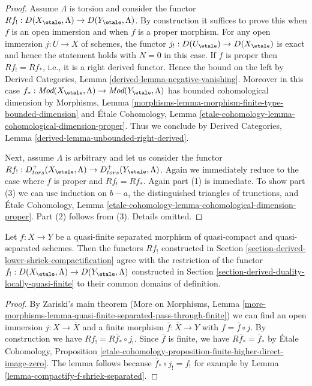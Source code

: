 \begin{proof}
Assume $\Lambda$ is torsion and consider the functor
$Rf_! : D(X_\etale, \Lambda) \to D(Y_\etale, \Lambda)$.
By construction it suffices to prove this when $f$ is an open immersion
and when $f$ is a proper morphism. For any open immersion $j : U \to X$
of schemes, the functor $j_! : D(U_\etale) \to D(X_\etale)$ is exact
and hence the statement holds with $N = 0$ in this case.
If $f$ is proper then $Rf_! = Rf_*$, i.e., it is a right derived
functor. Hence the bound on the left by
Derived Categories, Lemma \ref{derived-lemma-negative-vanishing}.
Moreover in this case $f_* : \textit{Mod}(X_\etale, \Lambda)
\to \textit{Mod}(Y_\etale, \Lambda)$ has bounded cohomological dimension by
Morphisms, Lemma \ref{morphisms-lemma-morphism-finite-type-bounded-dimension}
and \'Etale Cohomology, Lemma
\ref{etale-cohomology-lemma-cohomological-dimension-proper}.
Thus we conclude by
Derived Categories, Lemma \ref{derived-lemma-unbounded-right-derived}.

\medskip\noindent
Next, assume $\Lambda$ is arbitrary and let us consider the functor
$Rf_! : D^+_{tors}(X_\etale, \Lambda) \to D^+_{tors}(Y_\etale, \Lambda)$.
Again we immediately reduce to the case where $f$ is proper and
$Rf_! = Rf_*$. Again part (1) is immediate. To show part (3)
we can use induction on $b - a$, the distinguished
triangles of trunctions, and \'Etale Cohomology, Lemma
\ref{etale-cohomology-lemma-cohomological-dimension-proper}.
Part (2) follows from (3). Details omitted.
\end{proof}

\begin{lemma}
\label{lemma-Rf-shriek-for-quasi-finite}
Let $f : X \to Y$ be a quasi-finite separated morphism of quasi-compact and
quasi-separated schemes. Then the functors $Rf_!$ constructed in
Section \ref{section-derived-lower-shriek-compactification}
agree with the restriction of the functor
$f_! : D(X_\etale, \Lambda) \to D(Y_\etale, \Lambda)$
constructed in Section \ref{section-derived-duality-locally-quasi-finite}
to their common domains of definition.
\end{lemma}

\begin{proof}
By Zariski's main theorem (More on Morphisms, Lemma
\ref{more-morphisms-lemma-quasi-finite-separated-pass-through-finite})
we can find an open immersion $j : X \to \overline{X}$ and a finite morphism
$\overline{f} : \overline{X} \to Y$ with $f = \overline{f} \circ j$.
By construction we have $Rf_! = R\overline{f}_* \circ j_!$.
Since $\overline{f}$ is finite, we have $R\overline{f}_* = \overline{f}_*$
by \'Etale Cohomology, Proposition
\ref{etale-cohomology-proposition-finite-higher-direct-image-zero}.
The lemma follows because $\overline{f}_* \circ j_! = f_!$
for example by Lemma \ref{lemma-compactify-f-shriek-separated}.
\end{proof}

